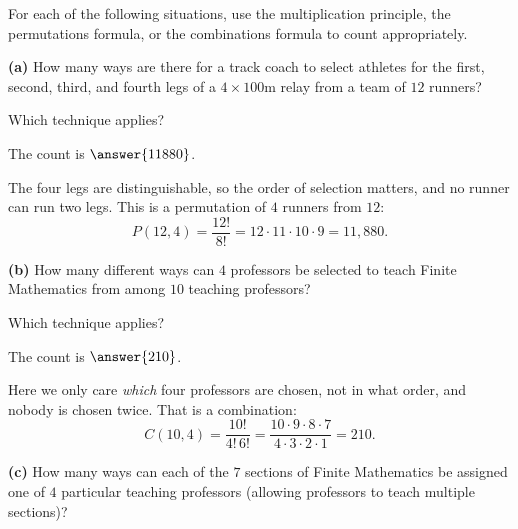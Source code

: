\documentclass[12pt]{ximera}
\begin{document}
\begin{problem}
For each of the following situations, use the multiplication principle, the
permutations formula, or the combinations formula to count appropriately.

\begin{prompt}
\textbf{(a)} How many ways are there for a track coach to select athletes for the
first, second, third, and fourth legs of a $4\times100\text{m}$ relay from a team of
$12$ runners?

Which technique applies?
\begin{multipleChoice}
\end{multipleChoice}

The count is $\answer{11880}$.

\begin{feedback}
The four legs are distinguishable, so the order of selection matters, and no runner
can run two legs. This is a permutation of $4$ runners from $12$:
\[
P(12,4)=\frac{12!}{8!}=12\cdot 11\cdot 10\cdot 9 = 11{,}880.
\]
\end{feedback}
\end{prompt}

\begin{prompt}
\textbf{(b)} How many different ways can $4$ professors be selected to teach Finite
Mathematics from among $10$ teaching professors?

Which technique applies?
\begin{multipleChoice}
\end{multipleChoice}

The count is $\answer{210}$.

\begin{feedback}
Here we only care \emph{which} four professors are chosen, not in what order, and
nobody is chosen twice. That is a combination:
\[
C(10,4)=\frac{10!}{4!\,6!}=\frac{10\cdot 9\cdot 8\cdot 7}{4\cdot 3\cdot 2\cdot 1}=210.
\]
\end{feedback}
\end{prompt}

\begin{prompt}
\textbf{(c)} How many ways can each of the $7$ sections of Finite Mathematics be
assigned one of $4$ particular teaching professors (allowing professors to teach
multiple sections)?


\end{prompt}
\end{problem}
\end{document}
